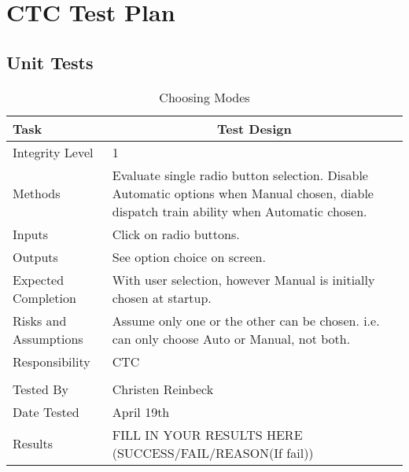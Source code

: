 \documentclass[]{article}
\begin{document}
\section{CTC Test Plan}
\subsection{Unit Tests}
\begin{table}[H]
	\centering
	\caption{Choosing Modes}
	\begin{tabular}{|l|l|}
		\hline
		Task & \multicolumn{1}{c|}{Test Design} \\ \hline
		Integrity Level & 1 \\ \hline
		Methods & \parbox[t]{10cm}{Evaluate single radio button selection. Disable Automatic options when Manual chosen, diable dispatch train ability when Automatic chosen.}\\ \hline
		Inputs &  Click on radio buttons. \\ \hline
		Outputs &  See option choice on screen.\\ \hline
		Expected Completion & \parbox[t]{10cm}{With user selection, however Manual is initially chosen at startup.}\\ \hline
		Risks and Assumptions & \parbox[t]{10cm}{Assume only one or the other can be chosen. i.e. can only choose Auto or Manual, not both.} \\ \hline
		Responsibility & CTC\\ \hline
		\\ \hline
		Tested By   &  Christen Reinbeck\\	\hline
		Date Tested & \parbox[t]{10cm}{April 19th}\\ \hline
		Results & FILL IN YOUR RESULTS HERE (SUCCESS/FAIL/REASON(If fail))\\ \hline
	\end{tabular}
\end{table}
\end{document}
